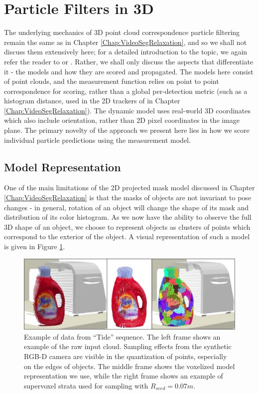 \section{Particle Filters in 3D}
\label{sec:PartFilt3d}
The underlying mechanics of 3D point cloud correspondence particle filtering remain the same as in Chapter \ref{Chap:VideoSegRelaxation}, and so we shall not discuss them extensively here; for a detailed introduction to the topic, we again refer the reader to \cite{Doucet2001} or \cite{SequentialMonteCarloMultitargetFiltering}. Rather, we shall only discuss the aspects that differentiate it - the models and how they are scored and propagated. The models here consist of point clouds, and the measurement function relies on point to point correspondence for scoring, rather than a global per-detection metric (such as a histogram distance, used in the 2D trackers of in Chapter \ref{Chap:VideoSegRelaxation}). The dynamic model uses real-world 3D coordinates which also include orientation, rather than 2D pixel coordinates in the image plane. The primary novelty of the approach we present here lies in how we score individual particle predictions using the measurement model. 

\subsection{Model Representation}
One of the main limitations of the 2D projected mask model discussed in Chapter \ref{Chap:VideoSegRelaxation} is that the masks of objects are not invariant to pose changes - in general, rotation of an object will change the shape of its mask and distribution of its color histogram. As we now have the ability to observe the full 3D shape of an object, we choose to represent objects as clusters of points which correspond to the exterior of the object. A visual representation of such a model is given in Figure \ref{fig:ModelExample}.

\begin{figure}[!ht]
  \centering
  \includegraphics[width=1.0\textwidth]{figures/Tracking/TideModelSV.pdf}
  \caption[Example of data from ``Tide'' sequence.]{Example of data from ``Tide'' sequence. The left frame shows an example of the raw input cloud. Sampling effects from the synthetic RGB-D camera are visible in the quantization of points, especially on the edges of objects. The middle frame shows the voxelized model representation we use, while the right frame shows an example of supervoxel strata used for sampling with $R_{seed} = 0.07m$.}
  \label{fig:ModelExample}
\end{figure}

